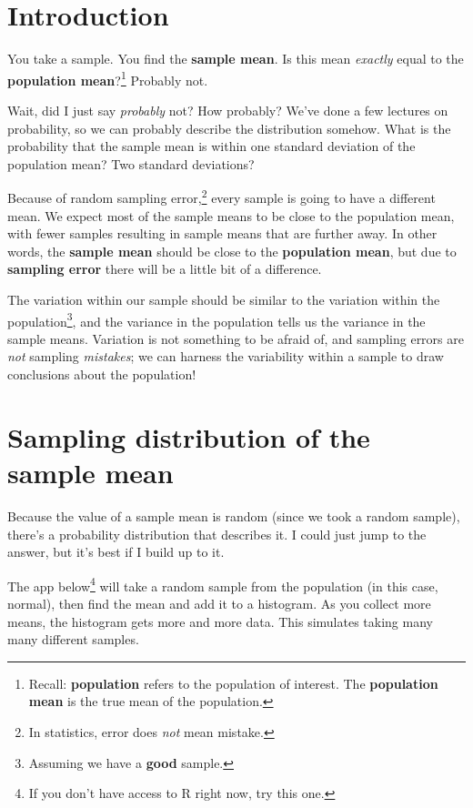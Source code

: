 \documentclass[
  letterpaper,
  DIV=11,
  numbers=noendperiod,
  oneside]{scrreprt}
\begin{document}
\hypertarget{introduction-5}{%
\section{Introduction}\label{introduction-5}}

You take a sample. You find the \textbf{sample mean}. Is this mean
\emph{exactly} equal to the \textbf{population mean}?\footnote{Recall:
  \textbf{population} refers to the population of interest. The
  \textbf{population mean} is the true mean of the population.} Probably
not.

Wait, did I just say \emph{probably} not? How probably? We've done a few
lectures on probability, so we can probably describe the distribution
somehow. What is the probability that the sample mean is within one
standard deviation of the population mean? Two standard deviations?

Because of random sampling error,\footnote{In statistics, error does
  \emph{not} mean mistake.} every sample is going to have a different
mean. We expect most of the sample means to be close to the population
mean, with fewer samples resulting in sample means that are further
away. In other words, the \textbf{sample mean} should be close to the
\textbf{population mean}, but due to \textbf{sampling error} there will
be a little bit of a difference.

The variation within our sample should be similar to the variation
within the population\footnote{Assuming we have a \textbf{good} sample.},
and the variance in the population tells us the variance in the sample
means. Variation is not something to be afraid of, and sampling errors
are \emph{not} sampling \emph{mistakes}; we can harness the variability
within a sample to draw conclusions about the population!

\hypertarget{sampling-distribution-of-the-sample-mean}{%
\section{Sampling distribution of the sample
mean}\label{sampling-distribution-of-the-sample-mean}}

Because the value of a sample mean is random (since we took a random
sample), there's a probability distribution that describes it. I could
just jump to the answer, but it's best if I build up to it.

The app below\footnote{If you don't have access to R right now, try this
  one.} will take a random sample from the population (in this case,
normal), then find the mean and add it to a histogram. As you collect
more means, the histogram gets more and more data. This simulates taking
many many different samples.
\end{document}
